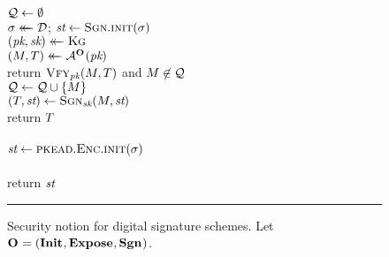 \begin{figure}[t]
  {
    \experimentv{$\Exp{\ufsig}_{\ds}(\advA,\dist)$}\\[2pt]
      $\mathcal{Q} \gets \emptyset$\\
      $\sigma \mathrel{\leftarrow\mkern-14mu\leftarrow} \mathcal{D}$;
      $\textit{st} \gets \textsc{Sgn}.\textsc{init}(\sigma)$\\
      $(\textit{pk}, \textit{sk}) \mathrel{\leftarrow\mkern-14mu\leftarrow} \textsc{Kg}$\\
      $(M, T) \mathrel{\leftarrow\mkern-14mu\leftarrow} \mathcal{A}^{\mathbf{O}\hspace{0.5pt}}(\textit{pk})$\\
      return $\textsc{Vfy}_{\textit{pk}}(M, T)$ and $M \not\in \mathcal{Q}$
  }
  {
    \oraclev{$\SGNO(\msg)$}\\[2pt]
      $\mathcal{Q} \gets \mathcal{Q} \cup \{M\}$\\
      $(T, \textit{st}) \gets \textsc{Sgn}_{\textit{sk}}(M, \textit{st})$\\
      return $T$
    \\[6pt]
    \oraclev{$\INITO(\stsel)$}\\[2pt]
      $\textit{st} \gets \textsc{pkead}.\textsc{Enc}.\textsc{init}(\sigma)$
    \\[6pt]
    \oraclev{$\EXPO$}\\[2pt]
      return $\textit{st}$
  }
  \caption{Security notion for digital signature schemes. Let $\mathbf{O}\hspace{0.5pt} =
  (\mathbf{Init}\hspace{0.5pt},\mathbf{Expose}\hspace{0.5pt},\mathbf{Sgn}\hspace{0.5pt})$.}
  \label{fig:ufsig}
  \vspace{6pt}\hrule
\end{figure}

%
